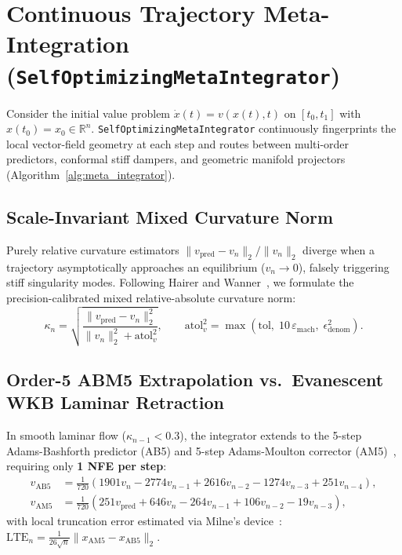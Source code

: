\documentclass[10pt,twocolumn,letterpaper]{article}
\theoremstyle{definition}
\theoremstyle{remark}
\newcommand{\R}{\mathbb{R}}
\newcommand{\epsmach}{\varepsilon_{\mathrm{mach}}}
\begin{document}
\section{Continuous Trajectory Meta-Integration (\texttt{SelfOptimizingMetaIntegrator})}
\label{sec:integrator}

Consider the initial value problem $\dot{x}(t) = v(x(t), t)$ on $[t_0, t_1]$ with $x(t_0) = x_0 \in \R^n$. \texttt{SelfOptimizingMetaIntegrator} continuously fingerprints the local vector-field geometry at each step and routes between multi-order predictors, conformal stiff dampers, and geometric manifold projectors (Algorithm~\ref{alg:meta_integrator}).

\subsection{Scale-Invariant Mixed Curvature Norm}
Purely relative curvature estimators $\|v_{\mathrm{pred}} - v_n\|_2 / \|v_n\|_2$ diverge when a trajectory asymptotically approaches an equilibrium ($v_n \to 0$), falsely triggering stiff singularity modes. Following Hairer and Wanner~\cite{hairer1996solving2}, we formulate the precision-calibrated mixed relative-absolute curvature norm:
\begin{equation}
  \kappa_n = \sqrt{\frac{\|v_{\mathrm{pred}} - v_n\|_2^2}{\|v_n\|_2^2 + \mathrm{atol}_v^2}}, \qquad \mathrm{atol}_v^2 = \max\!\left(\mathrm{tol},\; 10\,\epsmach,\; \epsilon_{\mathrm{denom}}^2\right).
  \label{eq:mixed_curvature}
\end{equation}

\subsection{Order-5 ABM5 Extrapolation vs.\ Evanescent WKB Laminar Retraction}
In smooth laminar flow ($\kappa_{n-1} < 0.3$), the integrator extends to the 5-step Adams-Bashforth predictor (AB5) and 5-step Adams-Moulton corrector (AM5)~\cite{hairer1993solving1}, requiring only \textbf{1 NFE per step}:
\begin{align}
  v_{\mathrm{AB5}} &= \frac{1}{720}\left(1901 v_n - 2774 v_{n-1} + 2616 v_{n-2} - 1274 v_{n-3} + 251 v_{n-4}\right), \label{eq:ab5}\\
  v_{\mathrm{AM5}} &= \frac{1}{720}\left(251 v_{\mathrm{pred}} + 646 v_n - 264 v_{n-1} + 106 v_{n-2} - 19 v_{n-3}\right), \label{eq:am5}
\end{align}
with local truncation error estimated via Milne's device~\cite{hairer1993solving1}: $\mathrm{LTE}_n = \frac{1}{26\sqrt{n}}\|x_{\mathrm{AM5}} - x_{\mathrm{AB5}}\|_2$.
\end{document}
